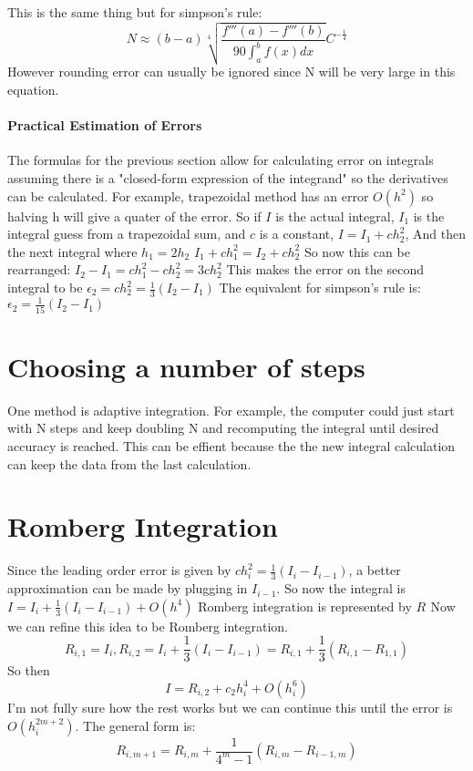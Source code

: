 \documentclass{report}
\begin{document}
This is the same thing but for simpson's rule:
\[N\approx (b-a)\sqrt[4]{\frac{f'''(a)-f'''(b)}{90\int_{a}^{b}f(x)dx}}C^{-\frac14}\]
However rounding error can usually be ignored since N will be very large in this equation.

\paragraph{Practical Estimation of Errors}
The formulas for the previous section allow for calculating error on integrals assuming there is a "closed-form expression of the integrand" so the derivatives can be calculated.
\newline\newline
For example, trapezoidal method has an error $O(h^2)$ so halving h will give a quater of the error. So if $I$ is the actual integral, $I_1$ is the integral guess from a trapezoidal sum, and $c$ is a constant, $I=I_1+ch_2^2$,
\newline And then the next integral where $h_1=2h_2$
\newline $I_1+ch_1^2=I_2+ch_2^2$
\newline So now this can be rearranged: $I_2-I_1=ch_1^2-ch_2^2=3ch_2^2$
\newline\newline This makes the error on the second integral to be $\epsilon_2=ch_2^2=\frac13(I_2-I_1)$
\newline The equivalent for simpson's rule is:$\epsilon_2=\frac1{15}(I_2-I_1)$


\section{Choosing a number of steps}
One method is adaptive integration. For example, the computer could just start with N steps and keep doubling N and recomputing the integral until desired accuracy is reached. This can be effient because the the new integral calculation can keep the data from the last calculation.
\section{Romberg Integration}
Since the leading order error is given by $ch_i^2=\frac13(I_i-I_{i-1})$, a better approximation can be made by plugging in $I_{i-1}$.
So now the integral is $I=I_i+\frac13(I_i-I_{i-1})+O(h^4)$
\newline\newline
Romberg integration is represented by $R_{}$
\newline
\newline
Now we can refine this idea to be Romberg integration.
\[R_{i,1}=I_i, R_{i,2}=I_i+\frac13(I_i-I_{i-1})=R_{i,1}+\frac13(R_{i,1}-R_{1,1})\]
So then
\[I=R_{i,2}+c_2h_i^4+O(h_i^6)\]
I'm not fully sure how the rest works but we can continue this until the error is $O(h_i^{2m+2})$. The general form is:
\[R_{i,m+1}=R_{i,m}+\frac1{4^m-1}(R_{i,m}-R_{i-1,m})\]
\end{document}
